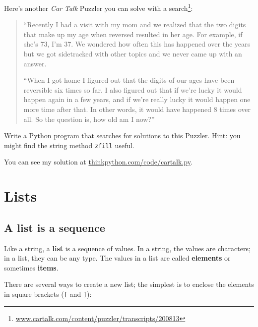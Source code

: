 \documentclass[10pt]{book}
\begin{document}
\begin{ex}
Here's another {\em Car Talk} Puzzler you can solve with a
search\footnote{\url{www.cartalk.com/content/puzzler/transcripts/200813}}:


\begin{quote}
``Recently I had a visit with my mom and we realized that
the two digits that make up my age when reversed resulted in her
age. For example, if she's 73, I'm 37. We wondered how often this has
happened over the years but we got sidetracked with other topics and
we never came up with an answer.

``When I got home I figured out that the digits of our ages have been
reversible six times so far. I also figured out that if we're lucky it
would happen again in a few years, and if we're really lucky it would
happen one more time after that. In other words, it would have
happened 8 times over all. So the question is, how old am I now?''

\end{quote}

Write a Python program that searches for solutions to this Puzzler.
Hint: you might find the string method {\tt zfill} useful.

You can see my solution at \url{thinkpython.com/code/cartalk.py}.

\end{ex}



\chapter{Lists}



\section{A list is a sequence}

Like a string, a {\bf list} is a sequence of values.  In a string, the
values are characters; in a list, they can be any type.  The values in
a list are called {\bf elements} or sometimes {\bf items}.


There are several ways to create a new list; the simplest is to
enclose the elements in square brackets (\verb"[" and \verb"]"):
\end{document}
